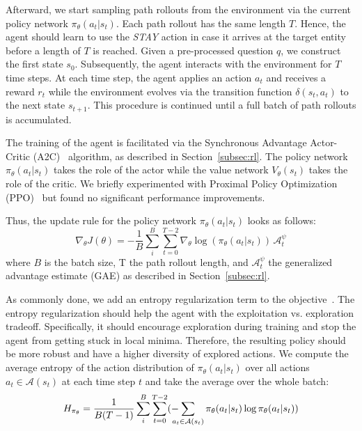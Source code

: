 Afterward, we start sampling path rollouts from the environment via the current policy network
$\pi_\theta(a_t | s_t)$. Each path rollout has the same length $T$. Hence, the agent 
should learn to use the \textit{STAY} action in case it arrives at 
the target entity before a length of $T$ is reached. Given a pre-processed question $q$, we construct the first state $s_0$.
Subsequently, the agent interacts with the environment for $T$ time steps. At each time step, 
the agent applies an action $a_t$ and receives a reward $r_t$ while the environment evolves 
via the transition function $\delta(s_t, a_t)$ to the next state $s_{t+1}$.
This procedure is continued until a full batch of path rollouts is accumulated.


The training of the agent is facilitated via the Synchronous Advantage Actor-Critic (A2C)~\cite{Mnih2016A2C} algorithm, 
as described in Section~\ref{subsec:rl}. The policy network 
$\pi_\theta(a_t | s_t)$ takes the role of the actor while the value network $V_\theta(s_t)$ takes 
the role of the critic. We briefly experimented with Proximal Policy Optimization (PPO)~\cite{Schulman2017PPO} but found no significant performance improvements.

Thus, the update rule for the policy network $\pi_\theta(a_t | s_t)$ looks as follows:
\begin{equation}
  \nabla_{\theta} J(\theta) = - \frac{1}{B} \sum_{i}^{B} \sum_{t=0}^{T-2} \nabla_{\theta} \log(\pi_{\theta} (a_t | s_t)) \, \mathcal{A}_{t}^{\psi}
\end{equation}
where $B$ is the batch size, T the path rollout length, and $\mathcal{A}_{t}^{\psi}$
the generalized advantage estimate (GAE) as described in Section~\ref{subsec:rl}.

As commonly done, we add an entropy regularization term to the objective~\cite{Das2018Minerva, Kaiser2021Reinforcement}.
The entropy regularization should help the agent with the exploitation vs. exploration tradeoff.
Specifically, it should encourage exploration during training and stop the agent from getting 
stuck in local minima. Therefore, the resulting policy should be more robust and have a higher diversity
 of explored actions. We compute the average entropy of the action distribution of
 $\pi_{\theta}(a_t | s_t)$ over all actions $a_t \in \mathcal{A}(s_t)$ at each time step $t$ and take the average over the 
 whole batch:
\begin{equation}
	H_{\pi_\theta} = \frac{1}{B(T-1)} \sum_{i}^{B} \sum_{t=0}^{T-2} (- \hspace{-0.3cm}\sum_{a_t \in \mathcal{A}(s_t)} \pi_\theta(a_t | s_t)  \log \pi_\theta(a_t | s_t))
\end{equation}


